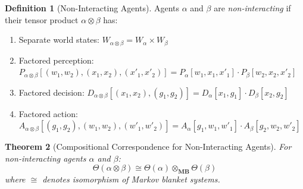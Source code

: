 \documentclass[11pt,a4paper]{article}
\theoremstyle{definition}
\newtheorem{definition}{Definition}[section]
\theoremstyle{plain}
\newtheorem{theorem}[definition]{Theorem}
\theoremstyle{remark}
\newcommand{\MB}{\mathbf{MB}}
\begin{document}
\begin{definition}[Non-Interacting Agents]\label{def:non-interacting}
Agents $\alpha$ and $\beta$ are \emph{non-interacting} if their tensor product $\alpha \otimes \beta$ has:
\begin{enumerate}[label=(\roman*)]
    \item Separate world states: $W_{\alpha \otimes \beta} = W_\alpha \times W_\beta$
    \item Factored perception: $P_{\alpha \otimes \beta}[(w_1,w_2), (x_1,x_2), (x'_1,x'_2)] = P_\alpha[w_1, x_1, x'_1] \cdot P_\beta[w_2, x_2, x'_2]$
    \item Factored decision: $D_{\alpha \otimes \beta}[(x_1,x_2), (g_1,g_2)] = D_\alpha[x_1, g_1] \cdot D_\beta[x_2, g_2]$
    \item Factored action: $A_{\alpha \otimes \beta}[(g_1,g_2), (w_1,w_2), (w'_1,w'_2)] = A_\alpha[g_1, w_1, w'_1] \cdot A_\beta[g_2, w_2, w'_2]$
\end{enumerate}
\end{definition}

\begin{theorem}[Compositional Correspondence for Non-Interacting Agents]\label{thm:composition-noninteracting}
For non-interacting agents $\alpha$ and $\beta$:
\[
\Theta(\alpha \otimes \beta) \cong \Theta(\alpha) \otimes_{\MB} \Theta(\beta)
\]
where $\cong$ denotes isomorphism of Markov blanket systems.
\end{theorem}
\end{document}
